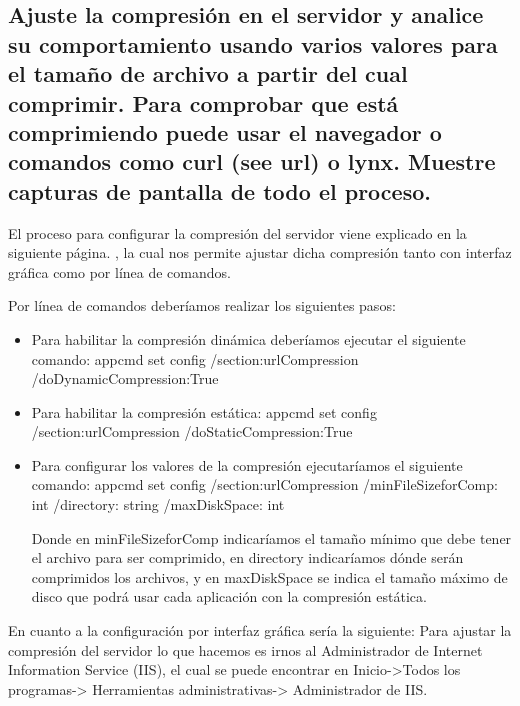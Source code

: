 \subsection{\Large 	Ajuste la compresión en el servidor y analice su comportamiento usando varios valores para el tamaño de archivo a partir del cual comprimir. Para comprobar que está comprimiendo puede usar el navegador o comandos como curl (see url) o lynx. Muestre capturas de pantalla de todo el proceso.}

El proceso para configurar la compresión del servidor viene explicado en la siguiente página. \cite{compresion}, la cual nos permite ajustar dicha compresión tanto con interfaz gráfica como por línea de comandos.

Por línea de comandos deberíamos realizar los siguientes pasos:

\begin{itemize}
	\item Para habilitar la compresión dinámica deberíamos ejecutar el siguiente comando: appcmd set config /section:urlCompression /doDynamicCompression:True
	
	\item Para habilitar la compresión estática: appcmd set config /section:urlCompression /doStaticCompression:True
	
	\item Para configurar los valores de la compresión ejecutaríamos el siguiente comando: appcmd set config /section:urlCompression /minFileSizeforComp: int /directory: string /maxDiskSpace: int


	Donde en minFileSizeforComp indicaríamos el tamaño mínimo que debe tener el archivo para ser comprimido, en directory indicaríamos dónde serán comprimidos los archivos, y en maxDiskSpace se indica el tamaño máximo de disco que podrá usar cada aplicación con la compresión estática.
\end{itemize}

En cuanto a la configuración por interfaz gráfica sería la siguiente:
Para ajustar la compresión del servidor lo que hacemos es irnos al Administrador de Internet Information Service (IIS), el cual se puede encontrar en Inicio->Todos los programas-> Herramientas administrativas-> Administrador de IIS.

